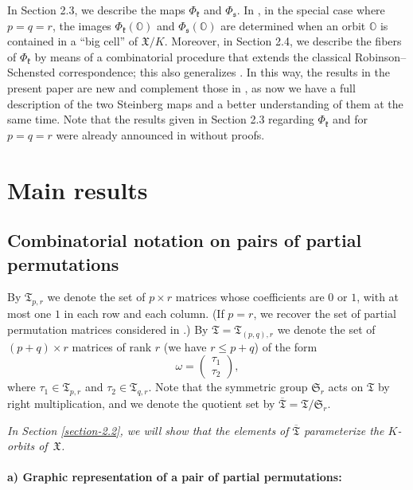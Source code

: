 \documentclass[11pt]{article}
\theoremstyle{definition}
\numberwithin{equation}{section}
\newcommand{\fk}{\mathfrak{k}}
\newcommand{\fs}{\mathfrak{s}}
\newcommand{\Xorbit}{\mathbb{O}}
\newcommand{\permutationsof}[1]{\mathfrak{S}_{#1}}
\newcommand{\ppermutationsof}{\mathfrak{T}}
\newcommand{\parameters}{\overline{\ppermutationsof}}
\newcommand{\Xfv}{\mathfrak{X}}
\begin{document}
In Section 2.3, we describe the maps $\Phi_\fk$ and $\Phi_\fs$. In \cite{FN2}, in the special case where $p=q=r$,
the images $\Phi_\fk(\Xorbit)$ and $\Phi_\fs(\Xorbit)$ are determined when an orbit $\Xorbit$ is contained in a ``big cell'' of $\Xfv/K$.
Moreover, in Section 2.4, we describe the fibers of $\Phi_\fk$ by means of a combinatorial procedure that extends the classical Robinson--Schensted correspondence; this also generalizes \cite[Theorem 7.8]{FN2}.
In this way, the results in the present paper are new and complement those in \cite{FN2}, as now we have a full description of the two Steinberg maps and a better understanding of them at the same time. Note that the results given in Section 2.3 regarding $\Phi_\fk$ and for $p=q=r$ were already announced in \cite[\S 2]{FN3} without proofs.




\section{Main results}

\subsection{Combinatorial notation on pairs of partial permutations}

\label{section-2.1}

By $\ppermutationsof_{p,r}$ we denote the set of $p\times r$ matrices whose coefficients are $0$ or $1$, with at most one $1$ in each row and each column.
(If $p=r$, we recover the set of partial permutation matrices considered in \cite{FN2}.)
By $\ppermutationsof=\ppermutationsof_{(p,q),r}$ we denote the set of $(p+q)\times r$ matrices of rank $r$ (we have $r\leq p+q$) of the form
\[\omega=\begin{pmatrix} \tau_1\\ \tau_2 \end{pmatrix},\]
where $\tau_1\in\ppermutationsof_{p,r}$ and $\tau_2\in\ppermutationsof_{q,r}$.
Note that the symmetric group $\permutationsof{r}$ acts on $\ppermutationsof$ by right multiplication, and we denote the quotient set by $\parameters=\ppermutationsof/\permutationsof{r}$.

{\em In Section \ref{section-2.2}, we will show that the elements of $\parameters$ parameterize the $K$-orbits of~$\Xfv$.}


\paragraph{\bf a) Graphic representation of a pair of partial permutations:}\
\end{document}
